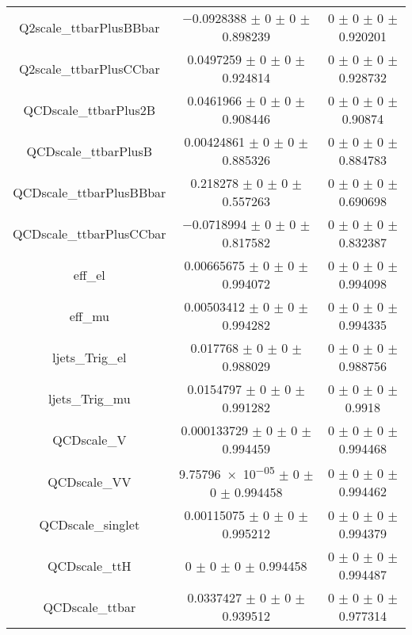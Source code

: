 \begin{table}
\begin{tabular}{ccc}
Q2scale\_ttbarPlusBBbar & \num{-0.0928388} $\pm$ \num{0} $\pm$ \num{0} $\pm$ \num{0.898239} & \num{0} $\pm$ \num{0} $\pm$ \num{0} $\pm$ \num{0.920201}\\
Q2scale\_ttbarPlusCCbar & \num{0.0497259} $\pm$ \num{0} $\pm$ \num{0} $\pm$ \num{0.924814} & \num{0} $\pm$ \num{0} $\pm$ \num{0} $\pm$ \num{0.928732}\\
QCDscale\_ttbarPlus2B & \num{0.0461966} $\pm$ \num{0} $\pm$ \num{0} $\pm$ \num{0.908446} & \num{0} $\pm$ \num{0} $\pm$ \num{0} $\pm$ \num{0.90874}\\
QCDscale\_ttbarPlusB & \num{0.00424861} $\pm$ \num{0} $\pm$ \num{0} $\pm$ \num{0.885326} & \num{0} $\pm$ \num{0} $\pm$ \num{0} $\pm$ \num{0.884783}\\
QCDscale\_ttbarPlusBBbar & \num{0.218278} $\pm$ \num{0} $\pm$ \num{0} $\pm$ \num{0.557263} & \num{0} $\pm$ \num{0} $\pm$ \num{0} $\pm$ \num{0.690698}\\
QCDscale\_ttbarPlusCCbar & \num{-0.0718994} $\pm$ \num{0} $\pm$ \num{0} $\pm$ \num{0.817582} & \num{0} $\pm$ \num{0} $\pm$ \num{0} $\pm$ \num{0.832387}\\
eff\_el & \num{0.00665675} $\pm$ \num{0} $\pm$ \num{0} $\pm$ \num{0.994072} & \num{0} $\pm$ \num{0} $\pm$ \num{0} $\pm$ \num{0.994098}\\
eff\_mu & \num{0.00503412} $\pm$ \num{0} $\pm$ \num{0} $\pm$ \num{0.994282} & \num{0} $\pm$ \num{0} $\pm$ \num{0} $\pm$ \num{0.994335}\\
ljets\_Trig\_el & \num{0.017768} $\pm$ \num{0} $\pm$ \num{0} $\pm$ \num{0.988029} & \num{0} $\pm$ \num{0} $\pm$ \num{0} $\pm$ \num{0.988756}\\
ljets\_Trig\_mu & \num{0.0154797} $\pm$ \num{0} $\pm$ \num{0} $\pm$ \num{0.991282} & \num{0} $\pm$ \num{0} $\pm$ \num{0} $\pm$ \num{0.9918}\\
QCDscale\_V & \num{0.000133729} $\pm$ \num{0} $\pm$ \num{0} $\pm$ \num{0.994459} & \num{0} $\pm$ \num{0} $\pm$ \num{0} $\pm$ \num{0.994468}\\
QCDscale\_VV & \num{9.75796e-05} $\pm$ \num{0} $\pm$ \num{0} $\pm$ \num{0.994458} & \num{0} $\pm$ \num{0} $\pm$ \num{0} $\pm$ \num{0.994462}\\
QCDscale\_singlet & \num{0.00115075} $\pm$ \num{0} $\pm$ \num{0} $\pm$ \num{0.995212} & \num{0} $\pm$ \num{0} $\pm$ \num{0} $\pm$ \num{0.994379}\\
QCDscale\_ttH & \num{0} $\pm$ \num{0} $\pm$ \num{0} $\pm$ \num{0.994458} & \num{0} $\pm$ \num{0} $\pm$ \num{0} $\pm$ \num{0.994487}\\
QCDscale\_ttbar & \num{0.0337427} $\pm$ \num{0} $\pm$ \num{0} $\pm$ \num{0.939512} & \num{0} $\pm$ \num{0} $\pm$ \num{0} $\pm$ \num{0.977314}\\

\end{tabular}
\end{table}

